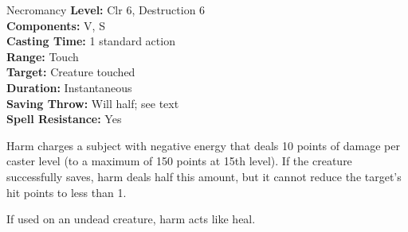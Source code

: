 {Necromancy}
{
	\textbf{Level:}
	Clr 6, Destruction 6\\
	\textbf{Components:}
	V, S\\
	\textbf{Casting Time:}
	1 standard action\\
	\textbf{Range:}
	Touch\\
	\textbf{Target:}
	Creature touched\\
	\textbf{Duration:}
	Instantaneous\\
	\textbf{Saving Throw:}
	Will half; see text\\
	\textbf{Spell Resistance:}
	Yes\\
}
{
	Harm charges a subject with negative energy that deals 10 points of damage per caster level (to a maximum of 150 points at 15th level). If the creature successfully saves, harm deals half this amount, but it cannot reduce the target's hit points to less than 1.

	If used on an undead creature, harm acts like heal.

}
